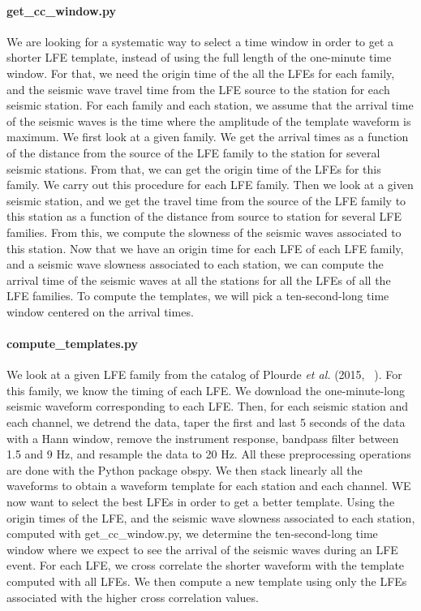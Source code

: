\documentclass[workdone.tex]{subfiles}
\begin{document}
\paragraph{get\_cc\_window.py} We are looking for a systematic way to select a time window in order to get a shorter LFE template, instead of using the full length of the one-minute time window. For that, we need the origin time of the all the LFEs for each family, and the seismic wave travel time from the LFE source to the station for each seismic station. For each family and each station, we assume that the arrival time of the seismic waves is the time where the amplitude of the template waveform is maximum. We first look at a given family. We get the arrival times as a function of the distance from the source of the LFE family to the station for several seismic stations. From that, we can get the origin time of the LFEs for this family. We carry out this procedure for each LFE family. Then we look at a given seismic station, and we get the travel time from the source of the LFE family to this station as a function of the distance from source to station for several LFE families. From this, we compute the slowness of the seismic waves associated to this station. Now that we have an origin time for each LFE of each LFE family, and a seismic wave slowness associated to each station, we can compute the arrival time of the seismic waves at all the stations for all the LFEs of all the LFE families. To compute the templates, we will pick a ten-second-long time window centered on the arrival times.

\paragraph{compute\_templates.py} We look at a given LFE family from the catalog of Plourde \textit{et al.} (2015, ~\cite{PLO_2015}). For this family, we know the timing of each LFE. We download the one-minute-long seismic waveform corresponding to each LFE. Then, for each seismic station and each channel, we detrend the data, taper the first and last 5 seconds of the data with a Hann window, remove the instrument response, bandpass filter between 1.5 and 9 Hz, and resample the data to 20 Hz. All these preprocessing operations are done with the Python package obspy. We then stack linearly all the waveforms to obtain a waveform template for each station and each channel. WE now want to select the best LFEs in order to get a better template. Using the origin times of the LFE, and the seismic wave slowness associated to each station, computed with get\_cc\_window.py, we determine the ten-second-long time window where we expect to see the arrival of the seismic waves during an LFE event. For each LFE, we cross correlate the shorter waveform with the template computed with all LFEs. We then compute a new template using only the LFEs associated with the higher cross correlation values.
\end{document}
